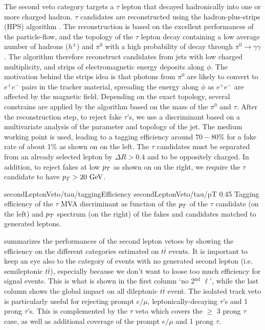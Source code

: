     The second veto category targets a $\tau$ lepton that decayed hadronically
    into one or more charged hadron. $\tau$ candidates are reconstructed using
    the hadron-plus-strips (HPS) algorithm \cite{TauID}. The reconstruction is
    based on the excellent performances of the particle-flow, and the topology
    of the $\tau$ lepton decay containing a low average number of hadrons
    ($h^\pm$) and $\pi^0$ with a high probability of decay through $\pi^0
    \rightarrow \gamma\gamma$. The algorithm therefore reconstruct candidates
    from jets with low charged multiplicity, and strips of electromagnetic
    energy deposits along $\phi$. The motivation behind the strips idea is that
    photons from $\pi^0$ are likely to convert to $e^+e^-$ pairs in the tracker
    material, spreading the energy along $\phi$ as $e^+e^-$ are affected by the
    magnetic field. Depending on the exact topology, several constrains are
    applied by the algorithm based on the mass of the $\pi^0$ and $\tau$. After
    the reconstruction step, to reject fake $\tau$'s, we use a discriminant
    based on a multivariate analysis of the parameter and topology of the jet.
    The medium working point is used, leading to a tagging efficiency around
    $70-80$\% for a fake rate of about 1\% as shown on
     on the left. The $\tau$ candidates must
    be separated from an already selected lepton by $\Delta R > 0.4$ and to be
    oppositely charged. In addition, to reject fakes at low $p_T$ as shown on
     on the right, we require the $\tau$
    candidate to have $p_T > 20~\text{GeV}$.

                     {secondLeptonVeto/tau/taggingEfficiency}
                     {secondLeptonVeto/tau/pT}
                     {0.45}
                     {Tagging efficiency of the $\tau$ MVA discriminant as
                     function of the $p_T$ of the $\tau$ candidate (on the left)
                     and $p_T$ spectrum (on the right) of the fakes and
                     candidates matched to generated leptons.}

     summarizes the performances of the
    second lepton vetoes by showing the efficiency on the different categories
    estimated on $t\bar{t}$ events. It is important to keep an eye also to the
    category of events with no generated second lepton (i.e. semileptonic
    $t\bar{t}$), especially because we don't want to loose too much efficiency
    for signal events. This is what is shown in the first column `no
    2$^\text{nd}$ $\ell$', while the last column shows the global impact on all
    dileptonic $t\bar{t}$ event. The isolated track veto is particularly useful
    for rejecting prompt $e/\mu$, leptonically-decaying $\tau$'s and 1 prong
    $\tau$'s. This is complemented by the $\tau$ veto which covers the $\geq$ 3
    prong $\tau$ case, as well as additional coverage of the prompt $e/\mu$ and
    1 prong $\tau$.

